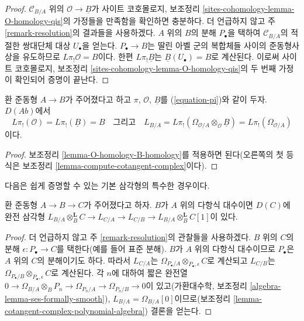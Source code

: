 \begin{proof}
$\mathcal{C}_{B/A}$ 위의 $\mathcal{O}\to\underline{B}$가 사이트
코호몰로지, 보조정리 \ref{sites-cohomology-lemma-O-homology-qis}의 가정들을
만족함을 확인하면 충분하다. 더 언급하지 않고 주
\ref{remark-resolution}의 결과들을 사용하겠다. $A$ 위의 $B$의 분해
$P_\bullet$을 택하여 $\mathcal{C}_{B/A}$의 적절한 쌍대단체 대상
$U_\bullet$을 얻는다. $P_\bullet\to B$는 딸린 아벨 군의 복합체들 사이의
준동형사상을 유도하므로 $L\pi_!\mathcal{O}=B$이다. 한편
$L\pi_!\underline{B}$는 $\underline{B}(U_\bullet)=B$로 계산된다. 이로써
사이트 코호몰로지, 보조정리
\ref{sites-cohomology-lemma-O-homology-qis}의 두 번째 가정이 확인되어
증명이 끝난다.
\end{proof}

\begin{lemma}
\label{lemma-apply-O-B-comparison}
환 준동형 $A\to B$가 주어졌다고 하고 $\pi$, $\mathcal{O}$,
$\underline{B}$를 (\ref{equation-pi})와 같이 두자. $D(\textit{Ab})$에서
$$
L\pi_!(\mathcal{O}) = L\pi_!(\underline{B}) = B
\quad\text{그리고}\quad
L_{B/A} = L\pi_!(\Omega_{\mathcal{O}/A} \otimes_\mathcal{O} \underline{B}) =
L\pi_!(\Omega_{\mathcal{O}/A})
$$
이다.
\end{lemma}

\begin{proof}
보조정리 \ref{lemma-O-homology-B-homology}를 적용하면 된다(오른쪽의 첫
등식은 보조정리 \ref{lemma-compute-cotangent-complex}이다).
\end{proof}

\noindent
다음은 쉽게 증명할 수 있는 기본 삼각형의 특수한 경우이다.

\begin{lemma}
\label{lemma-special-case-triangle}
환 준동형 $A\to B\to C$가 주어졌다고 하자. $B$가 $A$ 위의 다항식
대수이면 $D(C)$에 완전 삼각형
$L_{B/A}\otimes_B^\mathbf{L}C\to L_{C/A}\to L_{C/B}\to
L_{B/A}\otimes_B^\mathbf{L}C[1]$이 있다.
\end{lemma}

\begin{proof}
더 언급하지 않고 주 \ref{remark-resolution}의 관찰들을 사용하겠다.
$B$ 위의 $C$의 분해 $\epsilon:P_\bullet\to C$를 택한다(예를 들어 표준
분해). $B$가 $A$ 위의 다항식 대수이므로 $P_\bullet$은 $A$ 위의
$C$의 분해이기도 하다. 따라서 $L_{C/A}$는
$\Omega_{P_\bullet/A}\otimes_{P_\bullet,\epsilon}C$로 계산되고
$L_{C/B}$는 $\Omega_{P_\bullet/B}\otimes_{P_\bullet,\epsilon}C$로
계산된다. 각 $n$에 대하여 짧은 완전열
$0\to\Omega_{B/A}\otimes_BP_n\to\Omega_{P_n/A}\to
\Omega_{P_n/B}\to0$이 있고(가환대수학, 보조정리
\ref{algebra-lemma-ses-formally-smooth}),
$L_{B/A}=\Omega_{B/A}[0]$이므로(보조정리
\ref{lemma-cotangent-complex-polynomial-algebra}) 결론을 얻는다.
\end{proof}

